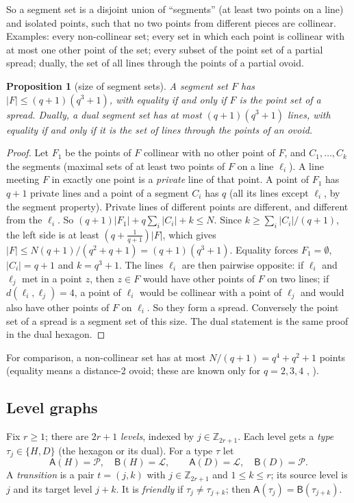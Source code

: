\documentclass[11pt]{amsart}
\newtheorem{proposition}[theorem]{Proposition}
\theoremstyle{definition}
\theoremstyle{remark}
\numberwithin{equation}{section}
\newcommand{\Z}{\mathbb Z}
\newcommand{\cL}{\mathcal L}
\newcommand{\cP}{\mathcal P}
\begin{document}
So a segment set is a disjoint union of ``segments'' (at least two points on a line) and isolated points, such that no two
points from different pieces are collinear. Examples: every non-collinear set; every set in which each point is collinear
with at most one other point of the set; every subset of the point set of a partial spread; dually, the set of all lines
through the points of a partial ovoid.

\begin{proposition}[size of segment sets]\label{prop:segmentsize}
A segment set $F$ has $|F|\le(q+1)(q^3+1)$, with equality if and only if $F$ is the point set of a spread. Dually, a dual
segment set has at most $(q+1)(q^3+1)$ lines, with equality if and only if it is the set of lines through the points of an
ovoid.
\end{proposition}

\begin{proof}
Let $F_1$ be the points of $F$ collinear with no other point of $F$, and $C_1,\dots,C_k$ the segments (maximal sets of at
least two points of $F$ on a line $\ell_i$). A line meeting $F$ in exactly one point is a \emph{private} line of that point.
A point of $F_1$ has $q+1$ private lines and a point of a segment $C_i$ has $q$ (all its lines except $\ell_i$, by the
segment property). Private lines of different points are different, and different from the $\ell_i$. So
$(q+1)|F_1|+q\sum_i|C_i|+k\le N$. Since $k\ge\sum_i|C_i|/(q+1)$, the left side is at least $(q+\frac1{q+1})|F|$, which
gives $|F|\le N(q+1)/(q^2+q+1)=(q+1)(q^3+1)$. Equality forces $F_1=\emptyset$, $|C_i|=q+1$ and $k=q^3+1$. The lines
$\ell_i$ are then pairwise opposite: if $\ell_i$ and $\ell_j$ met in a point $z$, then $z\in F$ would have other points of
$F$ on two lines; if $d(\ell_i,\ell_j)=4$, a point of $\ell_i$ would be collinear with a point of $\ell_j$ and would also
have other points of $F$ on $\ell_i$. So they form a spread. Conversely the point set of a spread is a segment set of this
size. The dual statement is the same proof in the dual hexagon.
\end{proof}

For comparison, a non-collinear set has at most $N/(q+1)=q^4+q^2+1$ points (equality means a distance-2 ovoid; these are
known only for $q=2,3,4$ \cite{DWVM08}, \cite{BI16}).

\subsection{Level graphs}\label{ssec:d7levels}
Fix $r\ge1$; there are $2r+1$ \emph{levels}, indexed by $j\in\Z_{2r+1}$. Each level gets a \emph{type}
$\tau_j\in\{H,D\}$ (the hexagon or its dual). For a type $\tau$ let
\[
\mathsf A(H)=\cP,\quad\mathsf B(H)=\cL,\qquad\mathsf A(D)=\cL,\quad\mathsf B(D)=\cP .
\]
A \emph{transition} is a pair $t=(j,k)$ with $j\in\Z_{2r+1}$ and $1\le k\le r$; its source level is $j$ and its target
level $j+k$. It is \emph{friendly} if $\tau_j\ne\tau_{j+k}$; then $\mathsf A(\tau_j)=\mathsf B(\tau_{j+k})$.
\end{document}
